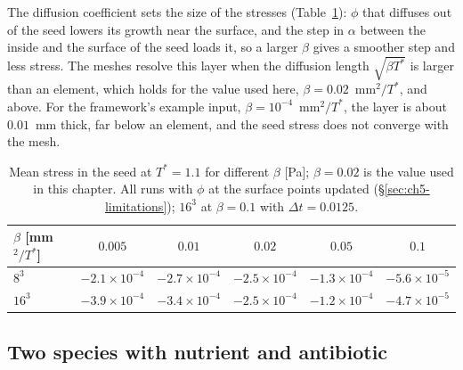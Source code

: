 The diffusion coefficient sets the size of the stresses
(Table~\ref{tab:ch5-beta}): $\phi$ that diffuses out of the seed lowers its growth near the surface, and the step in
$\alpha$ between the inside and the surface of the seed loads it, so a larger $\beta$ gives a smoother step and less stress.
The meshes resolve this layer when the diffusion length $\sqrt{\beta T^*}$ is larger than an element, which holds for the
value used here, $\beta=0.02$~mm$^2/T^*$, and above. For the framework's example input, $\beta=10^{-4}$~mm$^2/T^*$, the layer
is about $0.01$~mm thick, far below an element, and the seed stress does not converge with the mesh.

\begin{table}[htbp]
  \centering
  \caption[Sensitivity to the diffusion coefficient]{Mean stress in the seed
    at $T^*=1.1$ for different $\beta$ [Pa]; $\beta=0.02$ is the value used in
    this chapter. All runs with $\phi$ at the surface points updated
    (\S\ref{sec:ch5-limitations}); $16^3$ at $\beta=0.1$ with
    $\Delta t=0.0125$.}
  \label{tab:ch5-beta}
  \small
  \begin{tabular}{lccccc}
    \toprule
    $\beta$ [mm$^2/T^*$] & $0.005$ & $0.01$ & $0.02$ & $0.05$ & $0.1$ \\
    \midrule
    $8^3$ & $-2.1\times10^{-4}$ & $-2.7\times10^{-4}$ & $-2.5\times10^{-4}$ & $-1.3\times10^{-4}$ & $-5.6\times10^{-5}$ \\
    $16^3$ & $-3.9\times10^{-4}$ & $-3.4\times10^{-4}$ & $-2.5\times10^{-4}$ & $-1.2\times10^{-4}$ & $-4.7\times10^{-5}$ \\
    \bottomrule
  \end{tabular}
\end{table}

\subsection{Two species with nutrient and antibiotic}
\label{sec:ch5-two-species}

